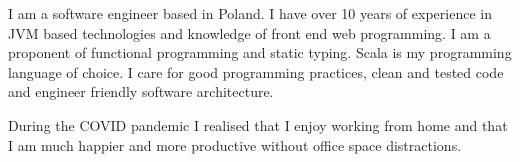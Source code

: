 \documentclass[8pt]{developercv} %
\begin{document}
\vspace{0.5cm}



\begin{minipage}[t]{0.4\textwidth} %
	\vspace{-\baselineskip} %
	
	I am a software engineer based in Poland. I have over 10 years of experience in JVM based technologies and knowledge of front end web programming. I am a proponent of functional programming and static typing. Scala is my programming language of choice. I care for good programming practices, clean and tested code and engineer friendly software architecture.

	During the COVID pandemic I realised that I enjoy working from home and that I am much happier and more productive without office space distractions.
\end{minipage}
\hfill %
\begin{minipage}[t]{0.5\textwidth} %
	\vspace{-\baselineskip} %
	\begin{barchart}{5.5}
	\end{barchart}
\end{minipage}

\begin{center}
\end{center}


\end{document}
